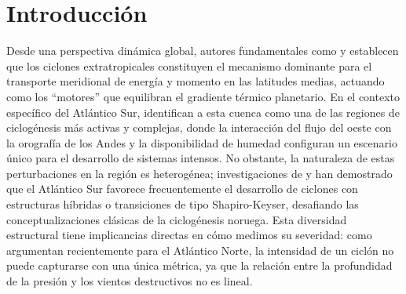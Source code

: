 \chapter{Introducción} \label{ch:introduccion}

Desde una perspectiva dinámica global, autores fundamentales como \citet{hoskins2002new} y \citet{sinclair1994objective} establecen que los ciclones extratropicales constituyen el mecanismo dominante para el transporte meridional de energía y momento en las latitudes medias, actuando como los ``motores'' que equilibran el gradiente térmico planetario.
En el contexto específico del Atlántico Sur, \citet{reboita2010south} identifican a esta cuenca como una de las regiones de ciclogénesis más activas y complejas, donde la interacción del flujo del oeste con la orografía de los Andes y la disponibilidad de humedad configuran un escenario único para el desarrollo de sistemas intensos.
No obstante, la naturaleza de estas perturbaciones en la región es heterogénea; investigaciones de \citet{evans2012climatology} y \citet{gozzo2013air} han demostrado que el Atlántico Sur favorece frecuentemente el desarrollo de ciclones con estructuras híbridas o transiciones de tipo Shapiro-Keyser, desafiando las conceptualizaciones clásicas de la ciclogénesis noruega.
Esta diversidad estructural tiene implicancias directas en cómo medimos su severidad: como argumentan recientemente \citet{corner2025classification} para el Atlántico Norte, la intensidad de un ciclón no puede capturarse con una única métrica, ya que la relación entre la profundidad de la presión y los vientos destructivos no es lineal.
